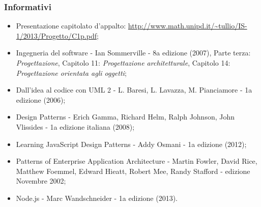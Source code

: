 		\subsubsection{Informativi}
		
		\begin{itemize}
		\item Presentazione capitolato d'appalto: \url{http://www.math.unipd.it/~tullio/IS-1/2013/Progetto/C1p.pdf};
		\item Ingegneria del software - Ian Sommerville - 8a edizione (2007), Parte terza: \textit{Progettazione}, Capitolo 11: \textit{Progettazione architetturale}, Capitolo 14: \textit{Progettazione orientata agli oggetti};
		\item Dall’idea al codice con UML 2 - L. Baresi, L. Lavazza, M. Pianciamore - 1a edizione
(2006);
		\item Design Patterns - Erich Gamma, Richard Helm, Ralph Johnson, John Vlissides - 1a edizione italiana (2008);
		\item Learning JavaScript Design Patterns - Addy Osmani - 1a edizione (2012);
		\item Patterns of Enterprise Application Architecture - Martin Fowler, David Rice, Matthew Foemmel, Edward Hieatt, Robert Mee, Randy Stafford - edizione Novembre 2002;
		\item Node.js - Marc Wandschneider - 1a edizione (2013).
		
		\end{itemize}
		
	\pagebreak
